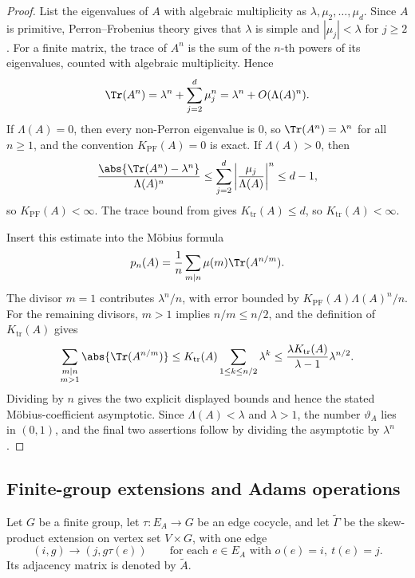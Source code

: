 \begin{proof}
  List the eigenvalues of \(A\) with algebraic multiplicity as
  \(\lambda,\mu_2,\dots,\mu_d\). Since \(A\) is primitive,
  Perron--Frobenius theory \cite{Seneta2006NonnegativeMatrices} gives that
  \(\lambda\) is simple and
  \(|\mu_j|<\lambda\) for \(j\ge 2\). For a finite matrix,
  the trace of \(A^n\) is the sum of the \(n\)-th powers of its
  eigenvalues, counted with algebraic multiplicity. Hence
  \[
    \Tr(A^n)
    =
    \lambda^n+\sum_{j=2}^d\mu_j^n
    =
    \lambda^n+O(\Lambda(A)^n).
  \]
  If \(\Lambda(A)=0\), then every non-Perron eigenvalue is \(0\), so
  \(\Tr(A^n)=\lambda^n\) for all \(n\ge 1\), and the convention
  \(K_{\mathrm{PF}}(A)=0\) is exact. If \(\Lambda(A)>0\), then
  \[
    \frac{\abs{\Tr(A^n)-\lambda^n}}{\Lambda(A)^n}
    \le
    \sum_{j=2}^d\left|\frac{\mu_j}{\Lambda(A)}\right|^n
    \le d-1,
  \]
  so \(K_{\mathrm{PF}}(A)<\infty\). The trace bound from
   gives \(K_{\mathrm{tr}}(A)\le d\), so
  \(K_{\mathrm{tr}}(A)<\infty\).

  Insert this estimate into the M\"obius formula
  \[
    p_n(A)=\frac{1}{n}\sum_{m\mid n}\mu(m)\Tr(A^{n/m}).
  \]
  The divisor \(m=1\) contributes \(\lambda^n/n\), with error bounded
  by \(K_{\mathrm{PF}}(A)\Lambda(A)^n/n\). For the remaining divisors,
  \(m>1\) implies \(n/m\le n/2\), and the definition of
  \(K_{\mathrm{tr}}(A)\) gives
  \[
    \sum_{\substack{m\mid n\\ m>1}}\abs{\Tr(A^{n/m})}
    \le
    K_{\mathrm{tr}}(A)\sum_{1\le k\le n/2}\lambda^k
    \le
    \frac{\lambda K_{\mathrm{tr}}(A)}{\lambda-1}\lambda^{n/2}.
  \]
  Dividing by \(n\) gives the two explicit displayed bounds and hence
  the stated M\"obius-coefficient asymptotic.
  Since \(\Lambda(A)<\lambda\) and \(\lambda>1\), the number
  \(\vartheta_A\) lies in \((0,1)\), and the final two assertions follow
  by dividing the asymptotic by \(\lambda^n\).
\end{proof}

\subsection{Finite-group extensions and Adams operations}

Let \(G\) be a finite group, let \(\tau:E_A\to G\) be an edge cocycle,
and let \(\widetilde\Gamma\) be the skew-product extension on vertex set
\(V\times G\), with one edge
\[
  (i,g)\longrightarrow (j,g\tau(e))
  \qquad \text{for each } e\in E_A \text{ with } o(e)=i,\ t(e)=j.
\]
Its adjacency matrix is denoted by \(\widetilde A\).

